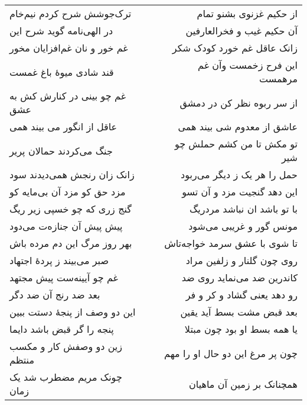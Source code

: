 \begin{center}
\begin{longtable}{l p{0.5cm} r}
\\
ترک‌جوشش شرح کردم نیم‌خام
&&
از حکیم غزنوی بشنو تمام
\\
در الهی‌نامه گوید شرح این
&&
آن حکیم غیب و فخرالعارفین
\\
غم خور و نان غم‌افزایان مخور
&&
زانک عاقل غم خورد کودک شکر
\\
قند شادی میوهٔ باغ غمست
&&
این فرح زخمست وآن غم مرهمست
\\
غم چو بینی در کنارش کش به عشق
&&
از سر ربوه نظر کن در دمشق
\\
عاقل از انگور می بیند همی
&&
عاشق از معدوم شی بیند همی
\\
جنگ می‌کردند حمالان پریر
&&
تو مکش تا من کشم حملش چو شیر
\\
زانک زان رنجش همی‌دیدند سود
&&
حمل را هر یک ز دیگر می‌ربود
\\
مزد حق کو مزد آن بی‌مایه کو
&&
این دهد گنجیت مزد و آن تسو
\\
گنج زری که چو خسپی زیر ریگ
&&
با تو باشد ان نباشد مردریگ
\\
پیش پیش آن جنازه‌ت می‌دود
&&
مونس گور و غریبی می‌شود
\\
بهر روز مرگ این دم مرده باش
&&
تا شوی با عشق سرمد خواجه‌تاش
\\
صبر می‌بیند ز پردهٔ اجتهاد
&&
روی چون گلنار و زلفین مراد
\\
غم چو آیینه‌ست پیش مجتهد
&&
کاندرین ضد می‌نماید روی ضد
\\
بعد ضد رنج آن ضد دگر
&&
رو دهد یعنی گشاد و کر و فر
\\
این دو وصف از پنجهٔ دستت ببین
&&
بعد قبض مشت بسط آید یقین
\\
پنجه را گر قبض باشد دایما
&&
یا همه بسط او بود چون مبتلا
\\
زین دو وصفش کار و مکسب منتظم
&&
چون پر مرغ این دو حال او را مهم
\\
چونک مریم مضطرب شد یک زمان
&&
همچنانک بر زمین آن ماهیان
\\
\end{longtable}
\end{center}

